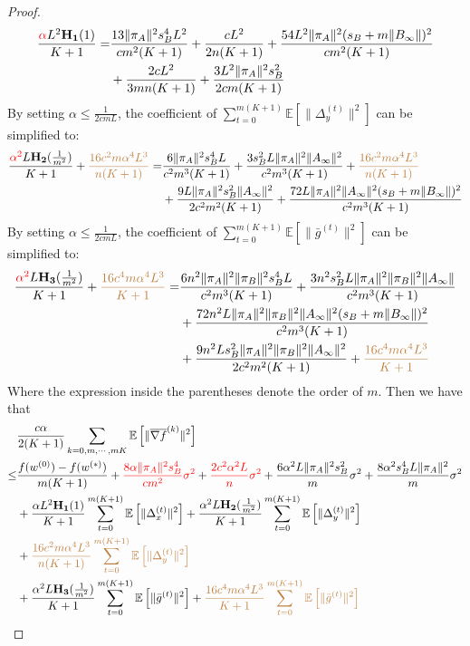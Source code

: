 \documentclass{article}
\newcommand{\EE}[1]{\mathbb{E}\left[#1\right]}
\newcommand{\norm}[1]{\| #1 \|}
\begin{document}
\begin{proof}
  \begin{align*}
    \frac{\textcolor{red}{\alpha}L^2\mathbf{H_1}(1)}{K+1}=&\frac{13\norm{\pi_A}^2s_B^4L^2}{cm^2(K+1)}+\frac{cL^2}{2n(K+1)}+\frac{54L^2\norm{\pi_A}^2(s_B+m\norm{B_{\infty}})^2}{cm^2(K+1)}\\&+\frac{2cL^2}{3mn(K+1)}+\frac{3L^2\norm{\pi_A}^2s_B^2}{2cm(K+1)}
  \end{align*}
  By setting $\alpha \leq \frac{1}{2cmL}$, the coefficient of $\sum_{t=0}^{m(K+1)}\EE{\norm{\Delta_y^{(t)}}^2}$ can be simplified to:
  \begin{align*}
    \frac{\textcolor{red}{\alpha^2}L\mathbf{H_2}(\frac{1}{m^2})}{K+1}+\textcolor{brown}{\frac{16c^2m\alpha^4L^3}{n(K+1)}}=&\frac{6\norm{\pi_A}^2s_B^4L}{c^2m^3(K+1)}+\frac{3s_B^2L\norm{\pi_A}^2\norm{A_{\infty}}^2}{c^2m^3(K+1)}+\textcolor{brown}{\frac{16c^2m\alpha^4L^3}{n(K+1)}}\\&+\frac{9L\norm{\pi_A}^2s_B^2\norm{A_{\infty}}^2}{2c^2m^2(K+1)}+\frac{72L\norm{\pi_A}^2\norm{A_{\infty}}^2(s_B+m\norm{B_{\infty}})^2}{c^2m^3(K+1)}
  \end{align*}
  By setting $\alpha \leq \frac{1}{2cmL}$, the coefficient of $\sum_{t=0}^{m(K+1)}\EE{\norm{\bar{g}^{(t)}}^2}$ can be simplified to:
  \begin{align*}
    \frac{\textcolor{red}{\alpha^2}L\mathbf{H_3}(\frac{1}{m^2})}{K+1}+\textcolor{brown}{\frac{16c^4m\alpha^4L^3}{K+1}}=&\frac{6n^2\norm{\pi_A}^2\norm{\pi_B}^2s_B^4L}{c^2m^3(K+1)}+\frac{3n^2s_B^2L\norm{\pi_A}^2\norm{\pi_B}^2\norm{A_{\infty}}}{c^2m^3(K+1)}\\&+\frac{72n^2L\norm{\pi_A}^2\norm{\pi_B}^2\norm{A_{\infty}}^2(s_B+m\norm{B_{\infty}})^2}{c^2m^3(K+1)}\\&+\frac{9n^2Ls_B^2\norm{\pi_A}^2\norm{\pi_B}^2\norm{A_{\infty}}^2}{2c^2m^2(K+1)}+\textcolor{brown}{\frac{16c^4m\alpha^4L^3}{K+1}}
  \end{align*}
  Where the expression inside the parentheses denote the order of $m$. Then we have that 
  \begin{align*}
    &\frac{c\alpha }{2(K+1)}\sum_{k=0,m,\cdots,mK}\EE{\norm{\overline{\nabla f}^{(k)}}^2}
  \\\leq& \frac{f(w^{(0)})-f(w^{(*)})}{m(K+1)}+\textcolor{red}{\frac{8\alpha \norm{\pi_A}^2s_B^4}{cm^2}\sigma^2}+\textcolor{red}{ \frac{2c^2\alpha^2L}{n}\sigma^2}+\frac{6\alpha^2L\norm{\pi_A}^2s_B^2}{m}\sigma^2+\frac{8\alpha^2s_B^4L\norm{\pi_A}^2}{m}\sigma^2\\&+\frac{\alpha L^2\mathbf{H_1}(1)}{K+1}\sum_{t=0}^{m(K+1)}\EE{\norm{\Delta_x^{(t)}}^2}+\frac{\alpha^2 L \mathbf{H_2}(\frac{1}{m^2})}{K+1}\sum_{t=0}^{m(K+1)}\EE{\norm{\Delta_y^{(t)}}^2}\\&+\textcolor{brown}{\frac{16c^2m\alpha^4L^3}{n(K+1)}\sum_{t=0}^{m(K+1)}\EE{\norm{\Delta_y^{(t)}}^2}}\\&+\frac{\alpha^2 L \mathbf{H_3}(\frac{1}{m^2})}{K+1}\sum_{t=0}^{m(K+1)}\EE{\norm{\bar{g}^{(t)}}^2}+\textcolor{brown}{\frac{16c^4m\alpha^4L^3}{K+1}\sum_{t=0}^{m(K+1)}\EE{\norm{\bar{g}^{(t)}}^2}}

\end{align*}
\end{proof}
\end{document}
